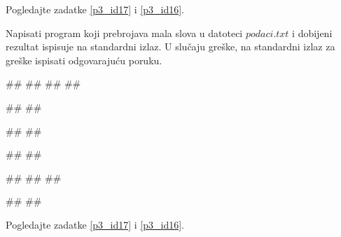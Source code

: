\begin{Answer}[ref=p3_iv3]
Pogledajte zadatke \ref{p3_id17} i \ref{p3_id16}.
\end{Answer}


\begin{Exercise}[label=p3_01] 
Napisati program koji prebrojava mala slova u datoteci $podaci.txt$ i dobijeni rezultat ispisuje na
standardni izlaz.
U slučaju greške, na standardni izlaz za greške ispisati odgovarajuću poruku.

\begin{minitest}
\begin{upotreba}{1}
##
##
##
##

#\naslovIzlaz#
##
\end{upotreba}
\end{minitest}
\begin{minitest}
\begin{upotreba}{2}
##
##

#\naslovIzlaz#
##
\end{upotreba}
\end{minitest}
\begin{minitest}
\begin{upotreba}{3}
##
##
##

#\naslovIzlaz#
##
\end{upotreba}
\end{minitest}
\end{Exercise}
\begin{Answer}[ref=p3_01]
Pogledajte zadatke \ref{p3_id17} i \ref{p3_id16}.
\end{Answer}


